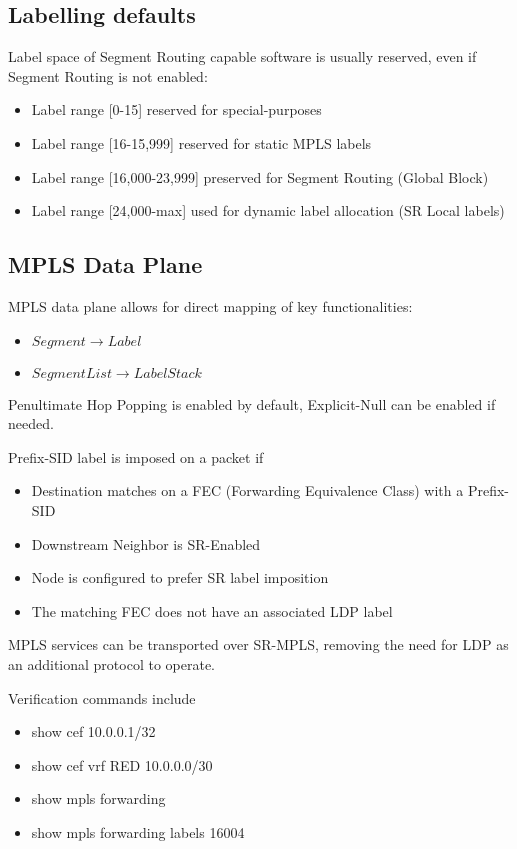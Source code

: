 \subsection{Labelling defaults}
Label space of Segment Routing capable software is usually reserved, even if Segment Routing is not enabled:

\begin{itemize}
    \item Label range [0-15] reserved for special-purposes
    \item Label range [16-15,999] reserved for static MPLS labels
    \item Label range [16,000-23,999] preserved for Segment Routing (Global Block)
    \item Label range [24,000-max] used for dynamic label allocation (SR Local labels)
\end{itemize}

\subsection{MPLS Data Plane}
MPLS data plane allows for direct mapping of key functionalities:

\begin{itemize}
    \item $Segment \rightarrow Label$
    \item $Segment List \rightarrow Label Stack$
\end{itemize}

\noindent
Penultimate Hop Popping is enabled by default,
Explicit-Null can be enabled if needed.

\vspace{5mm}
\noindent
Prefix-SID label is imposed on a packet if
\begin{itemize}
    \item Destination matches on a FEC (Forwarding Equivalence Class) with a Prefix-SID
    \item Downstream Neighbor is SR-Enabled
    \item Node is configured to prefer SR label imposition
    \item The matching FEC does not have an associated LDP label
\end{itemize} 

\noindent
MPLS services can be transported over SR-MPLS, removing the need for LDP as an additional protocol to operate.  

\vspace{5mm}
\noindent
Verification commands include
\ttfamily
\begin{itemize}
    \item show cef 10.0.0.1/32
    \item show cef vrf RED 10.0.0.0/30
    \item show mpls forwarding
    \item show mpls forwarding labels 16004 
\end{itemize}
\rmfamily